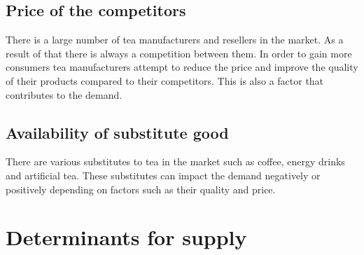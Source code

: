 \documentclass[12pt]{report}
\begin{document}
\subsection{Price of the competitors}
There is a large number of tea manufacturers and resellers in the market. As a result of that there is always a competition between them. In order to gain more consumers tea manufacturers attempt to reduce the price and improve the quality of their products compared to their competitors. This is also a factor that contributes to the demand.

\subsection{Availability of substitute good}
There are various substitutes to tea in the market such as coffee, energy drinks and artificial tea. These substitutes can impact the demand negatively or positively depending on factors such as their quality and price.

\section{Determinants for supply}
\end{document}
